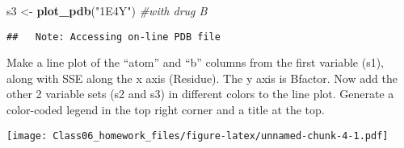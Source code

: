 \documentclass[]{article}
\newenvironment{Shaded}{\begin{snugshade}}{\end{snugshade}}
\newcommand{\CommentTok}[1]{\textcolor[rgb]{0.56,0.35,0.01}{\textit{#1}}}
\newcommand{\DataTypeTok}[1]{\textcolor[rgb]{0.13,0.29,0.53}{#1}}
\newcommand{\DecValTok}[1]{\textcolor[rgb]{0.00,0.00,0.81}{#1}}
\newcommand{\KeywordTok}[1]{\textcolor[rgb]{0.13,0.29,0.53}{\textbf{#1}}}
\newcommand{\NormalTok}[1]{#1}
\newcommand{\OperatorTok}[1]{\textcolor[rgb]{0.81,0.36,0.00}{\textbf{#1}}}
\newcommand{\OtherTok}[1]{\textcolor[rgb]{0.56,0.35,0.01}{#1}}
\newcommand{\StringTok}[1]{\textcolor[rgb]{0.31,0.60,0.02}{#1}}
\begin{document}
\begin{Shaded}
\begin{Highlighting}[]
\NormalTok{s3 <-}\StringTok{ }\KeywordTok{plot_pdb}\NormalTok{(}\StringTok{"1E4Y"}\NormalTok{) }\CommentTok{#with drug B}
\end{Highlighting}
\end{Shaded}

\begin{verbatim}
##   Note: Accessing on-line PDB file
\end{verbatim}

Make a line plot of the ``atom'' and ``b'' columns from the first
variable (s1), along with SSE along the x axis (Residue). The y axis is
Bfactor. Now add the other 2 variable sets (s2 and s3) in different
colors to the line plot. Generate a color-coded legend in the top right
corner and a title at the top.

\begin{Shaded}
\end{Shaded}

\texttt{[image: Class06\_homework\_files/figure-latex/unnamed-chunk-4-1.pdf]}
\end{document}
